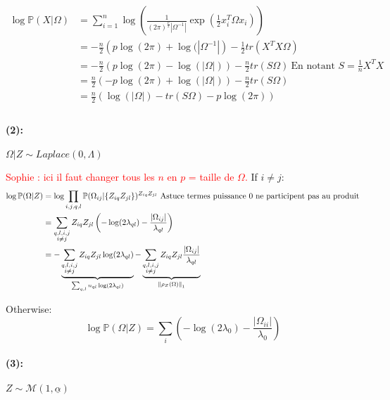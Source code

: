 \documentclass[10pt]{article}
\begin{document}
\begin{align*}
\log \mathbb{P}(X|\Omega) &= \sum_{i=1}^n \log \left( \frac{1}{(2\pi)^{\frac{p}{2}} |\Omega^{-1}|}  \exp(\frac{1}{2} x_i^{T} \Omega x_i) \right) \\
		& = -\frac{n}{2} \left( p\log(2\pi) + \log(|\Omega^{-1}| \right) - \frac{1}{2}tr(X^TX\Omega) \\ 
		& = -\frac{n}{2} \left( p\log(2\pi) - \log(|\Omega|) \right) - \frac{n}{2}tr(S\Omega)~ \text{En notant } S = \frac{1}{n}X^TX \\ 
		& = \frac{n}{2} \left( - p\log(2\pi) + \log(|\Omega|) \right) - \frac{n}{2}tr(S\Omega) \\ 
		& = \frac{n}{2} \left( \log(|\Omega|) - tr(S\Omega)  - p\log(2\pi) \right) \\
\end{align*}


\paragraph{(2):}  $\Omega|Z \sim Laplace(0, \Lambda)$


\textcolor{red}{Sophie : ici il faut changer tous les $n$ en $p$ = taille de $\Omega$. }
If $i\neq j$:
\begin{align*}
\log \mathbb{P}(\Omega|Z) &= \log \prod_{i,j,q,l} \mathbb{P}(\Omega_{ij}|\{Z_{iq}Z_{jl}\})^{Z_{iq}Z_{jl}}~ \text{Astuce termes puissance 0 ne participent pas au produit} \\ 
	& = \sum_{\substack{q,l,i,j \\ i \neq j}} Z_{iq}Z_{jl}\left( -\log (2\lambda_{ql}) - \frac{|\Omega_{ij}|}{\lambda_{ql}} \right) \\
	& = - \underbrace{\sum_{\substack{q,l,i,j \\ i \neq j}} Z_{iq}Z_{jl}\log (2\lambda_{ql})}_{\sum_{q,l} n_{ql} \log(2\lambda_{ql})} - \underbrace{\sum_{\substack{q,l,i,j \\ i \neq j}} Z_{iq}Z_{jl}\frac{|\Omega_{ij}|}{\lambda_{ql}}}_{\left\lVert{\rho_Z(\Omega)}\right\rVert_1} \\
\end{align*}

Otherwise: 
\[ \log \mathbb{P}(\Omega|Z) = \sum_{i} \left( -\log (2\lambda_{0}) - \frac{|\Omega_{ii}|}{\lambda_{0}} \right) \]


\paragraph{(3):} $Z \sim \mathcal{M}(1,\underline{\alpha})$
\end{document}
